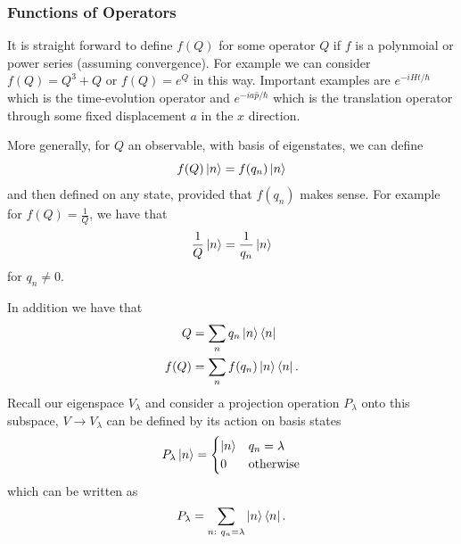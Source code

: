 \documentclass{article}
\begin{document}
\subsubsection{Functions of Operators}
It is straight forward to define $ f(Q) $ for some operator $ Q $ if $ f $ is a polynmoial or power series (assuming convergence). For example we can consider $ f(Q) = Q^3 + Q $ or $ f(Q) = e^Q $ in this way. Important examples are $ e^{-iHt/\hbar} $ which is the time-evolution operator and $ e^{-ia\hat p/\hbar} $ which is the translation operator through some fixed displacement $ a $ in the $ x $ direction.\par
More generally, for $ Q $ an observable, with basis of eigenstates, we can define
\[
  f(Q) \ket n = f(q_n) \ket n
\]
and then defined on any state, provided that $ f(q_n) $ makes sense. For example for $ f(Q) = \frac 1Q $, we have that
\[
	\frac 1 Q \ket n = \frac 1 {q_n} \ket n
\]
for $ q_n\ne 0 $.
\par
In addition we have that 
\begin{align*}
	Q &= \sum_n q_n \ket n \bra n \\
	f(Q) &= \sum_n f(q_n) \ket n \bra n.
\end{align*}
Recall our eigenspace $ V_\lambda $ and consider a projection operation $ P_\lambda $ onto this subspace, $ V\to V_\lambda $ can be defined by its action on basis states
\[
  P_\lambda \ket n = \begin{cases}
	  \ket n & q_n = \lambda \\
	  0 & \text{otherwise}
  \end{cases}
\]
which can be written as
\[
	P_\lambda  = \sum_{n: \ q_n = \lambda} \ket n \bra n.
\]
\end{document}
